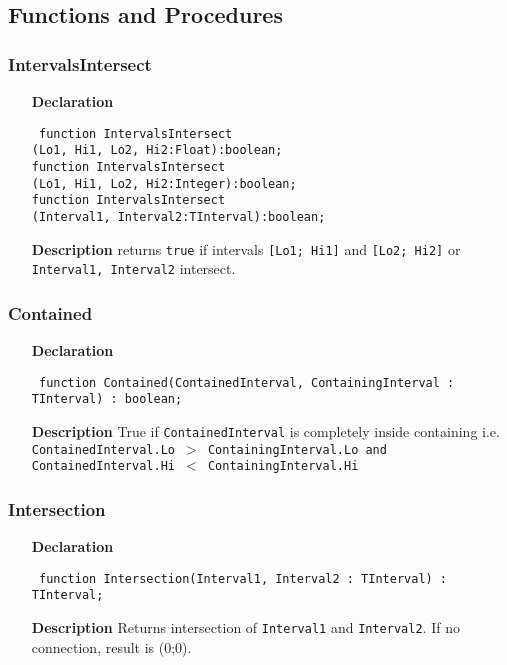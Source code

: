 \documentclass[12pt,a4paper,oneside]{report}
\newcommand{\declarationitem}[1]{\textbf{#1}}
\newcommand{\descriptiontitle}[1]{\textbf{#1}}
\newcommand{\code}[1]{\texttt{#1}}
\begin{document}
\subsection{Functions and Procedures}
\subsubsection{IntervalsIntersect}
\label{uIntervals-IntervalsIntersect}
\begin{itemize}\item[\declarationitem{Declaration}\hfill]
\begin{flushleft}
\code{
function IntervalsIntersect\\
\hspace{3cm}(Lo1, Hi1, Lo2, Hi2:Float):boolean;\\[6pt]
function IntervalsIntersect\\
\hspace{3cm}(Lo1, Hi1, Lo2, Hi2:Integer):boolean;\\[6pt]
function IntervalsIntersect\\
\hspace{3cm}(Interval1, Interval2:TInterval):boolean;}
\end{flushleft}
\item[\descriptiontitle{Description}]
returns \code{true} if intervals \code{[Lo1; Hi1]} and \code{[Lo2; Hi2]} or \code{Interval1, Interval2} intersect.
\end{itemize}
\subsubsection{Contained}
\label{uIntervals-Contained}
\begin{itemize}\item[\declarationitem{Declaration}\hfill]
\begin{flushleft}
\code{
function Contained(ContainedInterval, ContainingInterval : TInterval) : boolean;}
\end{flushleft}
\item[\descriptiontitle{Description}]
True if \code{ContainedInterval} is completely inside containing i.e. \code{ContainedInterval.Lo {$>$} ContainingInterval.Lo and ContainedInterval.Hi {$<$} ContainingInterval.Hi}

\end{itemize}
\subsubsection{Intersection}
\label{uIntervals-Intersection}
\begin{itemize}\item[\declarationitem{Declaration}\hfill]
\begin{flushleft}
\code{
function Intersection(Interval1, Interval2 : TInterval) : TInterval;}
\end{flushleft}

\item[\descriptiontitle{Description}]
Returns intersection of \code{Interval1} and \code{Interval2}. If no connection, result is (0;0).
\end{itemize}
\end{document}
